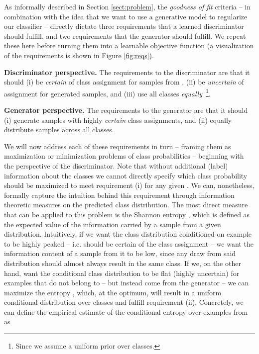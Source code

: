 \documentclass{article} \usepackage{iclr2016_conference,times}
\begin{document}
As informally described in Section \ref{sect:problem}, the
\emph{goodness of fit} criteria -- in combination 
with the idea that we want to use a generative model to regularize our
classifier -- directly dictate three requirements that a learned
discriminator should fulfill, and two requirements that the generator
should fulfill. We repeat these here before turning them into a
learnable objective function (a visualization of the requirements is shown
in Figure \ref{fig:reqs}). 

\textbf{Discriminator perspective.} The requirements to the
discriminator are that it should (i) be \emph{certain} of class
assignment for samples from , (ii) be \emph{uncertain} of
assignment for generated samples, and (iii) use all classes 
\emph{equally}~\footnote{Since we assume a uniform prior 
  over classes.}.

\textbf{Generator perspective.} The requirements to the
generator are that it should (i) generate samples with highly
\emph{certain} class assignments, and (ii) equally distribute samples
across all  classes.

We will now address each of these requirements in turn -- framing them
as maximization or minimization problems of class probabilities --
beginning with the perspective of the discriminator. Note
that without additional (label) information about the  classes we
cannot directly specify which class probability 
should be maximized to meet requirement (i) for any given .  We can,
nonetheless, formally capture the intuition behind this requirement
through information theoretic measures on the predicted class
distribution.  The most direct measure that can be applied to this
problem is the Shannon entropy , which is defined as the expected
value of the information carried by a sample from a given
distribution. Intuitively, if we want the class distribution  conditioned on example  to be highly peaked -- i.e. 
should be certain of the class assignment -- we want the
information content 
of a sample from it to be low,
since any draw from said distribution should almost always result in
the same class. If we, on 
the other hand, want the conditional class distribution to be flat (highly
uncertain) for examples that do not belong to  -- but
instead come from the generator --
we can maximize the entropy , which, at the
optimum, will result in a uniform conditional distribution over
classes and fulfill requirement (ii).
Concretely, we can define the empirical estimate of the conditional
entropy over examples from  as
\end{document}
